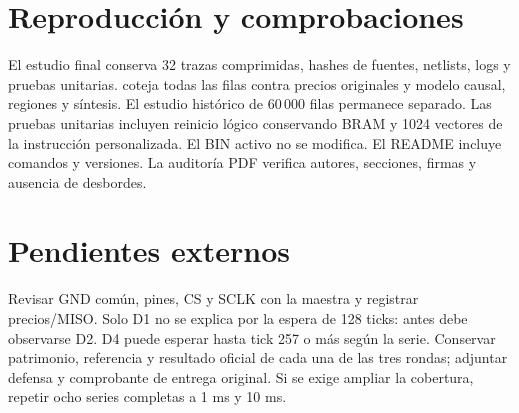 \documentclass[11pt,a4paper]{article}
\begin{document}
\section*{Reproducción y comprobaciones}
El estudio final conserva 32 trazas comprimidas, hashes de fuentes, netlists,
logs y pruebas unitarias.  coteja todas
las filas contra precios originales y modelo causal, regiones y síntesis.
El estudio histórico de 60\,000 filas permanece separado.
Las pruebas unitarias incluyen reinicio lógico conservando BRAM y 1024
vectores de la instrucción personalizada. El BIN activo no se modifica.
El README incluye comandos y versiones. La auditoría PDF verifica autores,
secciones, firmas y ausencia de desbordes.

\section*{Pendientes externos}
Revisar GND común, pines, CS y SCLK con la maestra y registrar precios/MISO.
Solo D1 no se explica por la espera de 128 ticks: antes debe observarse D2.
D4 puede esperar hasta tick 257 o más según la serie.
Conservar patrimonio, referencia y resultado oficial de cada una de las tres
rondas; adjuntar defensa y comprobante de entrega original.
Si se exige ampliar la cobertura, repetir ocho series completas a 1 ms y 10 ms.
\end{document}

